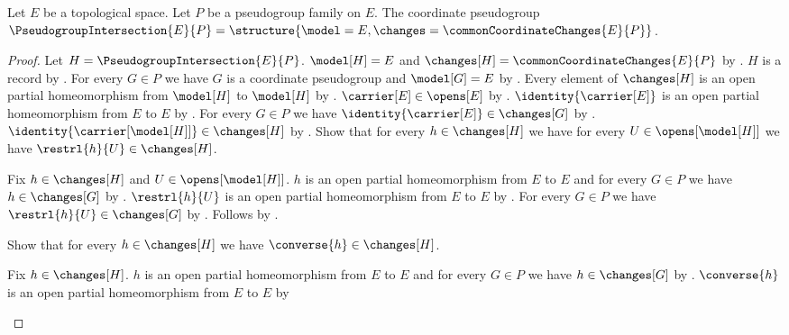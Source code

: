 \begin{construction}\label{pseudogroup_intersection}
    Let $E$ be a topological space.
    Let $P$ be a pseudogroup family on $E$.
    The coordinate pseudogroup $\PseudogroupIntersection{E}{P}=
        \structure{\model=E,\changes=\commonCoordinateChanges{E}{P}}$.
\end{construction}
\begin{proof}
    Let $H=\PseudogroupIntersection{E}{P}$.
    $\model[H]=E$ and $\changes[H]=\commonCoordinateChanges{E}{P}$ by
        .
    $H$ is a record by .
    For every $G\in P$ we have $G$ is a coordinate pseudogroup and $\model[G]=E$
        by .
    Every element of $\changes[H]$ is an open partial homeomorphism from
        $\model[H]$ to $\model[H]$ by .
    $\carrier[E]\in\opens[E]$ by .
    $\identity{\carrier[E]}$ is an open partial homeomorphism from $E$ to $E$ by
        .
    For every $G\in P$ we have $\identity{\carrier[E]}\in\changes[G]$ by
        .
    $\identity{\carrier[\model[H]]}\in\changes[H]$ by
        .
    Show that for every $h\in\changes[H]$ we have for every $U\in\opens[\model[H]]$
        we have $\restrl{h}{U}\in\changes[H]$.
    \begin{subproof}
        Fix $h\in\changes[H]$ and $U\in\opens[\model[H]]$.
        $h$ is an open partial homeomorphism from $E$ to $E$ and
            for every $G\in P$ we have $h\in\changes[G]$ by
            .
        $\restrl{h}{U}$ is an open partial homeomorphism from $E$ to $E$ by
            .
        For every $G\in P$ we have $\restrl{h}{U}\in\changes[G]$ by
            .
        Follows by .
    \end{subproof}
    Show that for every $h\in\changes[H]$ we have $\converse{h}\in\changes[H]$.
    \begin{subproof}
        Fix $h\in\changes[H]$.
        $h$ is an open partial homeomorphism from $E$ to $E$ and
            for every $G\in P$ we have $h\in\changes[G]$ by
            .
        $\converse{h}$ is an open partial homeomorphism from $E$ to $E$ by

\end{subproof}
\end{proof}
